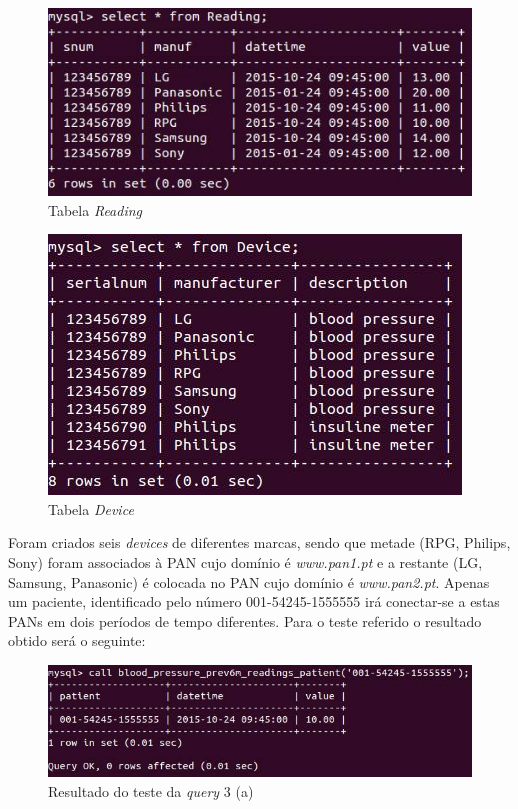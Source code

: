 \documentclass[a4paper]{article}
\begin{document}
\begin{figure}[ht!]
\centering
\includegraphics[scale=0.53]{3areading.jpg}
\caption{Tabela \textit{Reading}}
\end{figure}

\begin{figure}[ht!]
\centering
\includegraphics[scale=0.53]{3adevice.jpg}
\caption{Tabela \textit{Device}}
\end{figure}

Foram criados seis \textit{devices} de diferentes marcas, sendo que metade (RPG, Philips, Sony) foram associados à PAN cujo domínio é \textit{www.pan1.pt} e a restante (LG, Samsung, Panasonic) é colocada no PAN cujo domínio é \textit{www.pan2.pt}. Apenas um paciente, identificado pelo número 001-54245-1555555 irá conectar-se a estas PANs em dois períodos de tempo diferentes.
\vskip 16mm
Para o teste referido o resultado obtido será o seguinte:

\begin{figure}[ht!]
\centering
\includegraphics[scale=0.53]{teste3a.jpg}
\caption{Resultado do teste da \textit{query} 3 (a)}
\end{figure}
\end{document}
